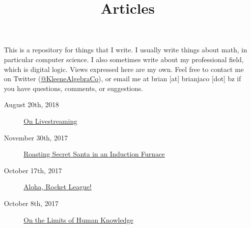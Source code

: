 \documentclass{article}
\title{Articles}
\date{}
\begin{document}
\maketitle

This is a repository for things that I write. I usually write things about math, in particular computer science. I also sometimes write about my professional field, which is digital logic. Views expressed here are my own. Feel free to contact me on Twitter (\href{https://twitter.com/KleeneAlgebraCo}{@KleeneAlgebraCo}), or email me at brian [at] brianjaco [dot] bz if you have questions, comments, or suggestions.

\begin{description}
\item[August 20th, 2018] \href{on-livestreaming/index.html}{On Livestreaming}
\item[November 30th, 2017] \href{secret-santa/index.html}{Roasting Secret Santa in an Induction Furnace}
\item[October 17th, 2017] \href{aloha-rocket-league/index.html}{Aloha, Rocket League!}
\item[October 8th, 2017] \href{limits-of-human-knowledge/index.html}{On the Limits of Human Knowledge}
\end{description}
\end{document}
